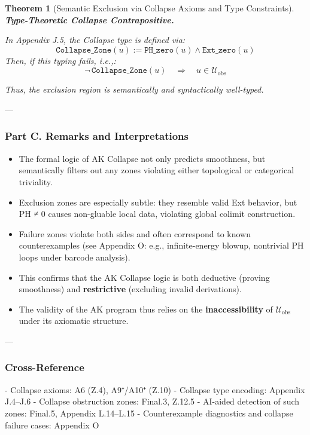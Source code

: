 \documentclass[11pt]{article}
\newtheorem{theorem}{Theorem}[section]
\begin{document}
\begin{axiom}
\begin{axiom}
{{\begin{theorem}[Semantic Exclusion via Collapse Axioms and Type Constraints]
\textbf{Type-Theoretic Collapse Contrapositive.}

In Appendix J.5, the Collapse type is defined via:
\[
\texttt{Collapse\_Zone}(u) := \texttt{PH\_zero}(u) \land \texttt{Ext\_zero}(u)
\]
Then, if this typing fails, i.e.,:
\[
\neg\, \texttt{Collapse\_Zone}(u) \quad \Rightarrow \quad u \in \mathcal{U}_{\mathrm{obs}}
\]

Thus, the exclusion region is semantically and syntactically well-typed.

\end{theorem}

---

\subsubsection*{Part C. Remarks and Interpretations}

\begin{itemize}
  \item The formal logic of AK Collapse not only predicts smoothness,  
  but semantically filters out any zones violating either topological or categorical triviality.

  \item Exclusion zones are especially subtle: they resemble valid Ext behavior,  
  but PH ≠ 0 causes non-gluable local data, violating global colimit construction.

  \item Failure zones violate both sides and often correspond to known counterexamples  
  (see Appendix O: e.g., infinite-energy blowup, nontrivial PH loops under barcode analysis).

  \item This confirms that the AK Collapse logic is both deductive (proving smoothness)  
  and \textbf{restrictive} (excluding invalid derivations).

  \item The validity of the AK program thus relies on the \textbf{inaccessibility}  
  of \( \mathcal{U}_{\mathrm{obs}} \) under its axiomatic structure.
\end{itemize}

---

\subsubsection*{Cross-Reference}

- Collapse axioms: A6 (Z.4), A9⁺/A10⁺ (Z.10)
- Collapse type encoding: Appendix J.4–J.6
- Collapse obstruction zones: Final.3, Z.12.5
- AI-aided detection of such zones: Final.5, Appendix L.14–L.15  
- Counterexample diagnostics and collapse failure cases: Appendix O

}}
\end{axiom}
\end{axiom}
\end{document}
